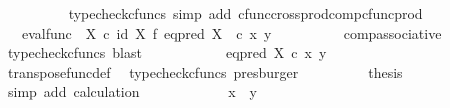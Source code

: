 \begin{isabellebody}
\ \ \ \ \ \ \ \ \isamarkupfalse%
\ {\isacharparenleft}{\kern0pt}typecheck{\isacharunderscore}{\kern0pt}cfuncs{\isacharcomma}{\kern0pt}\ simp\ add{\isacharcolon}{\kern0pt}\ cfunc{\isacharunderscore}{\kern0pt}cross{\isacharunderscore}{\kern0pt}prod{\isacharunderscore}{\kern0pt}comp{\isacharunderscore}{\kern0pt}cfunc{\isacharunderscore}{\kern0pt}prod{\isacharparenright}{\kern0pt}\isanewline
\ \ \ \ \ \ \isamarkupfalse%
\ \isamarkupfalse%
\ {\isachardoublequoteopen}{\isachardot}{\kern0pt}{\isachardot}{\kern0pt}{\isachardot}{\kern0pt}\ {\isacharequal}{\kern0pt}\ {\isacharparenleft}{\kern0pt}{\isacharparenleft}{\kern0pt}eval{\isacharunderscore}{\kern0pt}func\ {\isasymOmega}\ X{\isacharparenright}{\kern0pt}\ {\isasymcirc}\isactrlsub c\ {\isacharparenleft}{\kern0pt}id\ X\ {\isasymtimes}\isactrlsub f\ {\isacharparenleft}{\kern0pt}eq{\isacharunderscore}{\kern0pt}pred\ X\isactrlsup {\isasymsharp}{\isacharparenright}{\kern0pt}{\isacharparenright}{\kern0pt}\ {\isacharparenright}{\kern0pt}\ {\isasymcirc}\isactrlsub c\ {\isasymlangle}x{\isacharcomma}{\kern0pt}\ y{\isasymrangle}{\isachardoublequoteclose}\isanewline
\ \ \ \ \ \ \ \ \isamarkupfalse%
\ comp{\isacharunderscore}{\kern0pt}associative{}\ \isamarkupfalse%
\ {\isacharparenleft}{\kern0pt}typecheck{\isacharunderscore}{\kern0pt}cfuncs{\isacharcomma}{\kern0pt}\ blast{\isacharparenright}{\kern0pt}\isanewline
\ \ \ \ \ \ \isamarkupfalse%
\ \isamarkupfalse%
\ {\isachardoublequoteopen}{\isachardot}{\kern0pt}{\isachardot}{\kern0pt}{\isachardot}{\kern0pt}\ {\isacharequal}{\kern0pt}\ eq{\isacharunderscore}{\kern0pt}pred\ X\ {\isasymcirc}\isactrlsub c\ {\isasymlangle}x{\isacharcomma}{\kern0pt}\ y{\isasymrangle}{\isachardoublequoteclose}\isanewline
\ \ \ \ \ \ \ \ \isamarkupfalse%
\ transpose{\isacharunderscore}{\kern0pt}func{\isacharunderscore}{\kern0pt}def\ \isamarkupfalse%
\ {\isacharparenleft}{\kern0pt}typecheck{\isacharunderscore}{\kern0pt}cfuncs{\isacharcomma}{\kern0pt}\ presburger{\isacharparenright}{\kern0pt}\isanewline
\ \ \ \ \ \ \isamarkupfalse%
\ \isamarkupfalse%
\ {\isacharquery}{\kern0pt}thesis\isanewline
\ \ \ \ \ \ \ \ \isamarkupfalse%
\ {\isacharparenleft}{\kern0pt}simp\ add{\isacharcolon}{\kern0pt}\ calculation{\isacharparenright}{\kern0pt}\isanewline
\ \ \ \ \isamarkupfalse%
\isanewline
\ \ \ \ \isamarkupfalse%
\ \isamarkupfalse%
\ {\isachardoublequoteopen}x\ {\isacharequal}{\kern0pt}\ y{\isachardoublequoteclose}\isanewline

\end{isabellebody}
